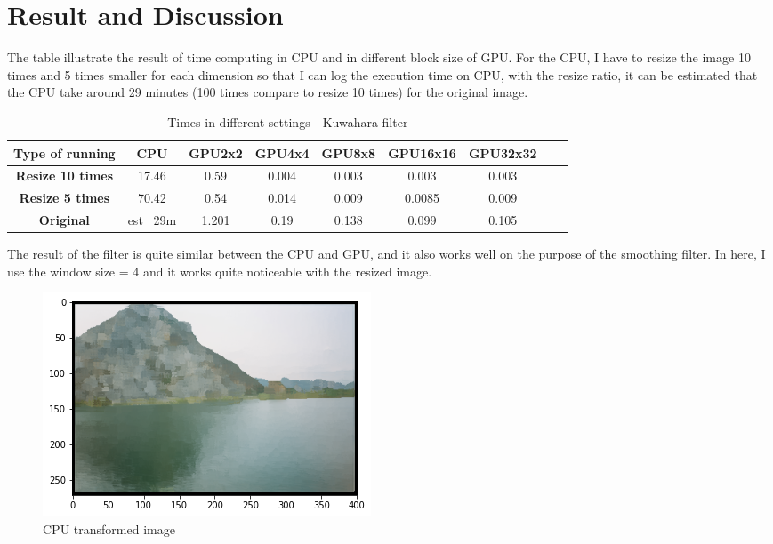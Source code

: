 \documentclass{article}
\begin{document}
\newpage
\section{Result and Discussion}
The table illustrate the result of time computing in CPU and in different block size of GPU. For the CPU, I have to resize the image 10 times and 5 times smaller for each dimension so that I can log the execution time on CPU, with the resize ratio, it can be estimated that the CPU take around 29 minutes (100 times compare to resize 10 times) for the original image.
\begin{table}[bp]
\caption{Times in different settings - Kuwahara filter }
\begin{tabular}{|c|c|c|c|c|c|c|c|c|}
\hline
\bfseries Type of running &CPU  &GPU2x2  &GPU4x4   &GPU8x8   &GPU16x16    &GPU32x32      \\
\hline\hline
\bfseries Resize 10 times     &17.46   &0.59 &0.004 &0.003 &0.003 &0.003    \\
\hline
\bfseries Resize 5 times     &70.42   &0.54 &0.014 &0.009 &0.0085 &0.009    \\
\hline
\bfseries Original     &est ~29m   &1.201 &0.19 &0.138 &0.099 &0.105    \\
\hline
\end{tabular}
\end{table} 

The result of the filter is quite similar between the CPU and GPU, and it also works well on the purpose of the smoothing filter. In here, I use the window size = 4 and it works quite noticeable with the resized image.
\begin{figure}
    \begin{center}
        \includegraphics[scale = 0.5]{cpu-resize.png}
        \caption{CPU transformed image}
    \end{center}
\end{figure}
\end{document}
